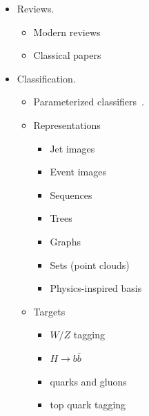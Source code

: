 \documentclass[12pt,letterpaper]{article}
\begin{document}
\begin{itemize}
\item Reviews.
	\begin{itemize}
		\item Modern reviews~\cite{Larkoski:2017jix,Guest:2018yhq,Albertsson:2018maf,Radovic:2018dip,Carleo:2019ptp,Kasieczka:2019dbj,Bourilkov:2019yoi}
		 \item Classical papers~\cite{Denby:1987rk,Lonnblad:1990bi}
	\end{itemize}
\item Classification.
	\begin{itemize}
		\item Parameterized classifiers~\cite{Baldi:2016fzo,Cranmer:2015bka}.
		\item Representations
			\begin{itemize}
				\item Jet images~\cite{Pumplin:1991kc,Cogan:2014oua,deOliveira:2015xxd,ATL-PHYS-PUB-2017-017,Lin:2018cin,Komiske:2018oaa,Barnard:2016qma,Komiske:2016rsd,Kasieczka:2017nvn,Macaluso:2018tck}
				\item Event images~\cite{Nguyen:2018ugw,ATL-PHYS-PUB-2019-028,Lin:2018cin,Andrews:2018nwy}
				\item Sequences~\cite{Guest:2016iqz,Nguyen:2018ugw}
				\item Trees~\cite{Louppe:2017ipp,Cheng:2017rdo}
				\item Graphs~\cite{Henrion:DLPS2017,Ju:2020xty,Martinez:2018fwc,Moreno:2019bmu,Qasim:2019otl,Chakraborty:2019imr,Chakraborty:2020yfc,1797439,1801423}
				\item Sets (point clouds)~\cite{Komiske:2018cqr,Qu:2019gqs}
				\item Physics-inspired basis~\cite{Datta:2019,Datta:2017rhs,Datta:2017lxt,Komiske:2017aww,Butter:2017cot}
			\end{itemize}
		\item Targets
			\begin{itemize}
			\item $W/Z$ tagging~\cite{deOliveira:2015xxd,Barnard:2016qma,Louppe:2017ipp,Sirunyan:2020lcu,Chen:2019uar}
			\item $H\rightarrow b\bar{b}$~\cite{Datta:2019ndh,Lin:2018cin,Moreno:2019neq,Chakraborty:2019imr,Sirunyan:2020lcu}
			\item quarks and gluons~\cite{ATL-PHYS-PUB-2017-017,Komiske:2016rsd,Cheng:2017rdo,Stoye:DLPS2017,Chien:2018dfn,Moreno:2019bmu,Kasieczka:2018lwf}
			\item top quark tagging~\cite{Stoye:DLPS2017,Kasieczka:2019dbj,Chakraborty:2020yfc,Diefenbacher:2019ezd,Butter:2017cot,Kasieczka:2017nvn,Macaluso:2018tck}

\end{itemize}
\end{itemize}
\end{itemize}
\end{document}
